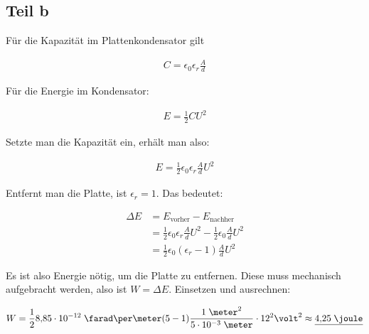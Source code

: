 \documentclass[a4paper,german,12pt,smallheadings]{scrartcl}
\begin{document}
\subsection*{Teil b}

Für die Kapazität im Plattenkondensator gilt

\begin{align*}
  C = \epsilon_0 \epsilon_r \frac{A}{d}
\end{align*}

Für die Energie im Kondensator:

\begin{align*}
  E = \frac{1}{2} C U^2
\end{align*}


Setzte man die Kapazität ein, erhält man also:

\begin{align*}
  E = \frac{1}{2} \epsilon_0 \epsilon_r \frac{A}{d}  U^2
\end{align*}

Entfernt man die Platte, ist $\epsilon_r = 1$. Das bedeutet:

\begin{align*}
  \Delta E &= E_\text{vorher} - E_\text{nachher}  \\ 
           &= \frac{1}{2} \epsilon_0 \epsilon_r \frac{A}{d}  U^2 - \frac{1}{2} \epsilon_0 \frac{A}{d}  U^2 \\
           &= \frac{1}{2} \epsilon_0 (\epsilon_r - 1) \frac{A}{d}  U^2
\end{align*}

Es ist also Energie nötig, um die Platte zu entfernen. Diese muss mechanisch
aufgebracht werden, also ist $W = \Delta E$. Einsetzen und ausrechnen:

\begin{align*}
  W = \frac{1}{2} 8{,}85 \cdot 10^{-12} \;\farad\per\meter (5-1) \frac{1\;\meter^2}{5\cdot 10^{-3}\;\meter} \cdot 12^2 \volt^2 \approx \underline{4{,}25\;\joule}
\end{align*}
\end{document}
